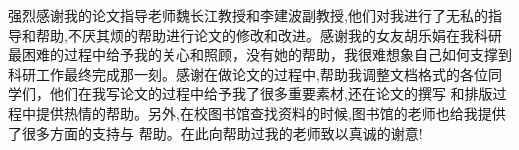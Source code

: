 
\begin{thanks}

强烈感谢我的论文指导老师魏长江教授和李建波副教授,他们对我进行了无私的指导和帮助,不厌其烦的帮助进行论文的修改和改进。感谢我的女友胡乐娟在我科研最困难的过程中给予我的关心和照顾，没有她的帮助，我很难想象自己如何支撑到科研工作最终完成那一刻。感谢在做论文的过程中,帮助我调整文档格式的各位同学们，他们在我写论文的过程中给予我了很多重要素材,还在论文的撰写 和排版过程中提供热情的帮助。另外,在校图书馆查找资料的时候,图书馆的老师也给我提供了很多方面的支持与 帮助。在此向帮助过我的老师致以真诚的谢意!

\end{thanks}
